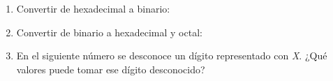 \documentclass[12pt]{article}
\begin{document}
\begin{enumerate}

    \item Convertir de hexadecimal a binario:


    \item Convertir de binario a hexadecimal y octal:


    \item En el siguiente número se desconoce un dígito representado con
        \emph{X}. ¿Qué valores puede tomar ese dígito desconocido?

    \begin{enumerate*}[itemjoin=\hspace{2em}]


\end{enumerate*}
\end{enumerate}
\end{document}

